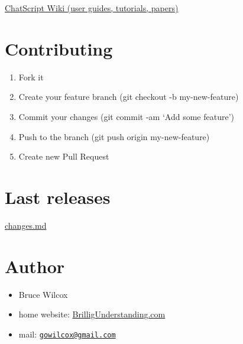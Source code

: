 \documentclass[]{article}
\providecommand{\tightlist}{%
  \setlength{\itemsep}{0pt}\setlength{\parskip}{0pt}}
\begin{document}
\href{/WIKI/README.md}{ChatScript Wiki (user guides, tutorials, papers)}

\section{Contributing}\label{contributing}

\begin{enumerate}
\def\labelenumi{\arabic{enumi}.}
\tightlist
\item
  Fork it
\item
  Create your feature branch (git checkout -b my-new-feature)
\item
  Commit your changes (git commit -am `Add some feature')
\item
  Push to the branch (git push origin my-new-feature)
\item
  Create new Pull Request
\end{enumerate}

\section{Last releases}\label{last-releases}

\href{/changes.md}{changes.md}

\section{Author}\label{author}

\begin{itemize}
\tightlist
\item
  Bruce Wilcox
\item
  home website:
  \href{http://www.brilligunderstanding.com}{BrilligUnderstanding.com}
\item
  mail: \href{mailto:gowilcox@gmail.com}{\nolinkurl{gowilcox@gmail.com}}
\end{itemize}
\end{document}
